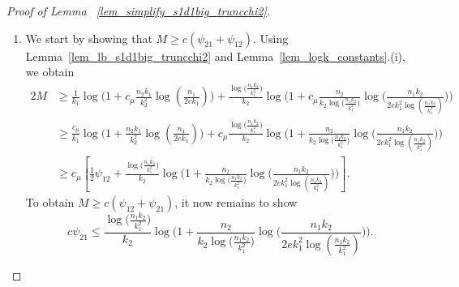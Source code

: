 \documentclass{article}
\begin{document}
\begin{proof}[Proof of Lemma ~\ref{lem_simplify_s1d1big_truncchi2}]
\phantom{ }

\begin{enumerate}
\item We start by showing that $M \geq c(\psi_{21} + \psi_{12})$. 
    Using  Lemma~\ref{lem_lb_s1d1big_truncchi2} and Lemma~\ref{lem_logk_constants}.(i), we obtain
\begin{align*}
    2M &\geq\frac{1}{k_1}\log\Big(1 + c_\mu \frac{n_2k_1}{k_2^2}\log(\frac{n_1}{2ek_1})\Big) + \frac{\log\big(\frac{n_1k_2}{k_1^2}\big)}{k_2}\log\Big(1 + c_\mu \frac{n_2}{k_2\log\big(\frac{n_1k_2}{k_1^2}\big)}\log \big(\frac{n_1k_2}{2ek_1^2\log(\frac{n_1k_2}{k_1^2})}\big)\Big) \\
    &\geq\frac{c_\mu}{k_1}\log\Big(1 + \frac{n_2k_1}{k_2^2}\log(\frac{n_1}{2ek_1})\Big) + c_\mu\frac{\log\big(\frac{n_1k_2}{k_1^2}\big)}{k_2}\log\Big(1 +  \frac{n_2}{k_2\log\big(\frac{n_1k_2}{k_1^2}\big)}\log \big(\frac{n_1k_2}{2ek_1^2\log(\frac{n_1k_2}{k_1^2})}\big)\Big) \\
    &\geq c_\mu \left[\frac{1}{2}\psi_{12} + \frac{\log\big(\frac{n_1k_2}{k_1^2}\big)}{k_2}\log\Big(1 + \frac{n_2}{k_2\log\big(\frac{n_1k_2}{k_1^2}\big)}\log \big(\frac{n_1k_2}{2ek_1^2\log(\frac{n_1k_2}{k_1^2})}\big)\Big)\right].
\end{align*}
To obtain $M \geq c(\psi_{12} + \psi_{21})$, it now remains to show
\[c\psi_{21} \leq \frac{\log\big(\frac{n_1k_2}{k_1^2}\big)}{k_2}\log\Big(1 + \frac{n_2}{k_2\log\big(\frac{n_1k_2}{k_1^2}\big)}\log \big(\frac{n_1k_2}{2ek_1^2\log(\frac{n_1k_2}{k_1^2})}\big)\Big).\]


\end{enumerate}
\end{proof}
\end{document}
